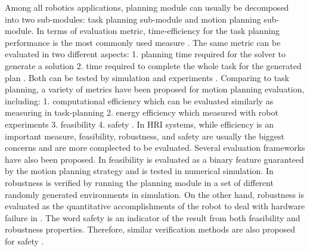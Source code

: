  Among all robotics applications, planning module can usually be decomposed into two sub-modules: task planning sub-module and motion planning sub-module. In terms of evaluation metric, time-efficiency for the task planning performance is the most commonly used measure \cite{foster1999influence,edan1991near,galindo2004improving}.  The same metric can be evaluated in two different aspects: 1. planning time required for the solver to generate a solution \cite{galindo2004improving} 2. time required to complete the whole task for the generated plan \cite{edan1991near}. Both can be tested by simulation \cite{edan1991near,kaelbling2011hierarchical} and experiments \cite{galindo2004improving,alatartsev2015robotic}.  Comparing to task planning, a variety of metrics have been proposed for motion planning evaluation, including: 1. computational efficiency \cite{buckley1989fast} which can be evaluated similarly as measuring in task-planning 2. energy efficiency \cite{mei2004energy} which measured with robot experiments 3. feasibility \cite{cowlagi2012hierarchical} 4. safety \cite{frazzoli2002real}. In HRI systems, while efficiency is an important measure, feasibility, robustness, and safety are usually the biggest concerns and are more complected to be evaluated. Several evaluation frameworks have also been proposed. In  \cite{cowlagi2012hierarchical,karaman2011sampling} feasibility is evaluated as a binary feature guaranteed by the motion planning strategy and is tested in numerical simulation. In \cite{svenstrup2010trajectory} robustness is verified by running the planning module in a set of different randomly generated environments in simulation. On the other hand, robustness is evaluated as the quantitative accomplishments of the robot to deal with hardware failure in \cite{yim2007modular}. The word safety is an indicator of the result from both feasibility and robustness properties. Therefore, similar verification methods are also proposed for safety \cite{frazzoli2002real,guo2002distributed,sisbot2007human,kuffner2005motion}.  




\begin{comment}
Researches also proposed that in order to further increase efficiency, task-planning and motion planning should be done together. In \cite{garrett2015ffrob,mahmoudzadeh2016toward}, by incorporating the constraints from geometry and kinematics, these hybrid methods guarantees successful completion of task plans. The previous evaluation methods are applicable in these hybrid methods as well.  
(reason for deleting: not very related)
\end{comment}

